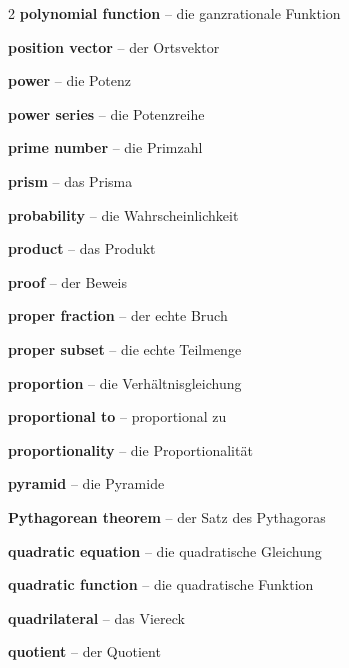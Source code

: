 \begin{multicols}{2}
\textbf{polynomial function} -- die ganzrationale Funktion\dotfill\hyperref[e:126]{\pageref*{e:126}}\par
\textbf{position vector} -- der Ortsvektor\dotfill\hyperref[e:302]{\pageref*{e:302}}\par
\textbf{power} -- die Potenz\dotfill\hyperref[e:42]{\pageref*{e:42}}\par
\textbf{power series} -- die Potenzreihe\dotfill\hyperref[e:267]{\pageref*{e:267}}\par
\textbf{prime number} -- die Primzahl\dotfill\hyperref[e:12]{\pageref*{e:12}}\par
\textbf{prism} -- das Prisma\dotfill\hyperref[e:228]{\pageref*{e:228}}\par
\textbf{probability} -- die Wahrscheinlichkeit\dotfill\hyperref[e:330]{\pageref*{e:330}}\par
\textbf{product} -- das Produkt\dotfill\hyperref[e:22]{\pageref*{e:22}}\par
\textbf{proof} -- der Beweis\dotfill\hyperref[e:349]{\pageref*{e:349}}\par
\textbf{proper fraction} -- der echte Bruch\dotfill\hyperref[e:31]{\pageref*{e:31}}\par
\textbf{proper subset} -- die echte Teilmenge\dotfill\hyperref[e:99]{\pageref*{e:99}}\par
\textbf{proportion} -- die Verhältnisgleichung\dotfill\hyperref[e:41]{\pageref*{e:41}}\par
\textbf{proportional to} -- proportional zu\dotfill\hyperref[e:68]{\pageref*{e:68}}\par
\textbf{proportionality} -- die Proportionalität\dotfill\hyperref[e:94]{\pageref*{e:94}}\par
\textbf{pyramid} -- die Pyramide\dotfill\hyperref[e:230]{\pageref*{e:230}}\par
\textbf{Pythagorean theorem} -- der Satz des Pythagoras\dotfill\hyperref[e:190]{\pageref*{e:190}}\par

\par\nopagebreak
\textbf{quadratic equation} -- die quadratische Gleichung\dotfill\hyperref[e:82]{\pageref*{e:82}}\par
\textbf{quadratic function} -- die quadratische Funktion\dotfill\hyperref[e:124]{\pageref*{e:124}}\par
\textbf{quadrilateral} -- das Viereck\dotfill\hyperref[e:196]{\pageref*{e:196}}\par
\textbf{quotient} -- der Quotient\dotfill\hyperref[e:25]{\pageref*{e:25}}\par


\end{multicols}
